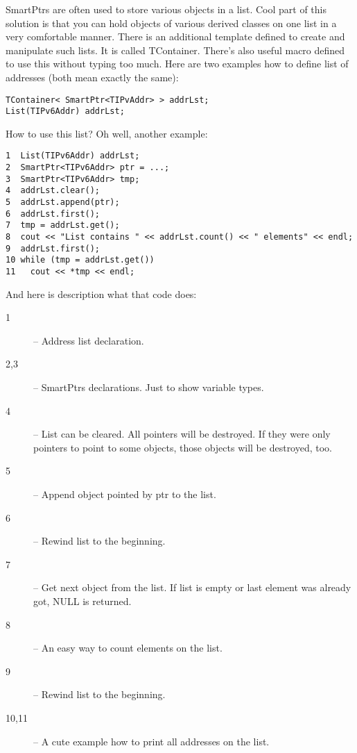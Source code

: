 SmartPtrs are often used to store various objects in a list. Cool part
of this solution is that you can hold objects of various derived
classes on one list in a very comfortable manner. There is an
additional template defined to create and manipulate such lists. It is
called TContainer. There's also useful macro defined to use this
without typing too much. Here are two examples how to define list of
addresses (both mean exactly the same):
\begin{verbatim}
TContainer< SmartPtr<TIPvAddr> > addrLst;
List(TIPv6Addr) addrLst;
\end{verbatim}

How to use this list? Oh well, another example:
\begin{verbatim}
1  List(TIPv6Addr) addrLst;
2  SmartPtr<TIPv6Addr> ptr = ...;
3  SmartPtr<TIPv6Addr> tmp;
4  addrLst.clear();
5  addrLst.append(ptr);
6  addrLst.first();
7  tmp = addrLst.get();
8  cout << "List contains " << addrLst.count() << " elements" << endl;
9  addrLst.first();
10 while (tmp = addrLst.get()) 
11   cout << *tmp << endl;
\end{verbatim}

And here is description what that code does:

\begin{description}
\item[1] -- Address list declaration.
\item[2,3] -- SmartPtrs declarations. Just to show variable types.
\item[4] -- List can be cleared. All pointers will be destroyed. If
  they were only pointers to point to some objects, those objects will
  be destroyed, too.
\item[5] -- Append object pointed by ptr to the list.
\item[6] -- Rewind list to the beginning.
\item[7] -- Get next object from the list. If list is empty or last
  element was already got, NULL is returned.
\item[8] -- An easy way to count elements on the list.
\item[9] -- Rewind list to the beginning.
\item[10,11] -- A cute example how to print all addresses on the list.
\end{description}

